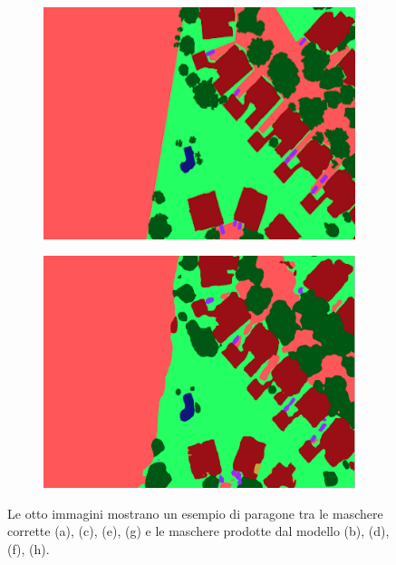 \begin{figure}[h!]
\begin{subfigure}[b]{0.45\textwidth}
         \includegraphics[width=\textwidth]{img/4_1.png}
         \caption{}
         \label{}
     \end{subfigure}
     \hfill
     \begin{subfigure}[b]{0.45\textwidth}
         \centering
         \includegraphics[width=\textwidth]{img/4_2.png}
         \caption{}
         \label{}
     \end{subfigure}
        \caption{Le otto immagini mostrano un esempio di paragone tra le maschere corrette (a), (c), (e), (g) e le maschere prodotte dal modello (b), (d), (f), (h).}
        \label{fig:ground_vs_inference}
\end{figure}















